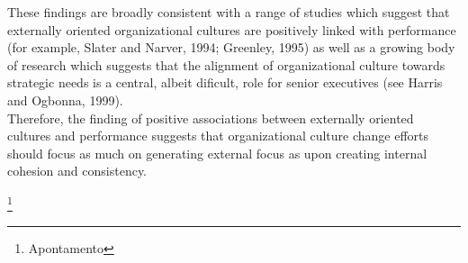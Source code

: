 These findings are broadly consistent with a range of studies which suggest that externally oriented organizational cultures are positively linked with performance (for example, Slater and Narver, 1994; Greenley, 1995) as well as a growing body of research which suggests that the alignment of organizational culture towards strategic needs is a central, albeit dificult, role for senior executives (see Harris and Ogbonna, 1999).\\

Therefore, the finding of positive associations between externally oriented cultures and performance suggests that organizational culture change efforts should focus as much on generating external focus as upon creating internal cohesion and consistency.\\


\newpage
%
%
\listoffigures
\cite{*}

\newpage
\footnote{Apontamento}

